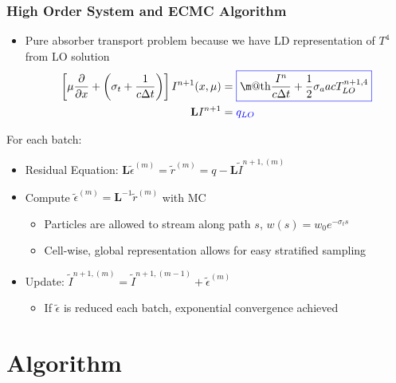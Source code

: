 \documentclass[xcolor=dvipsnames,hyperref={pdfpagelabels=false},unknownkeysallowed]{beamer}
\makeatletter
\newcommand*{\boxedcolor}{blue}
\renewcommand{\boxed}[1]{\textcolor{\boxedcolor}{%
  \fbox{\normalcolor\m@th$\displaystyle#1$}}}
\newcommand{\colb}[1]{{\color{blue} #1}}
\newlength{\wideitemsep}
\let\olditem\item
\renewcommand{\item}{\setlength{\itemsep}{\wideitemsep}\olditem}
\newcommand{\pderiv}[2]{\frac{\partial #1}{\partial #2}}
\newcommand{\B}[1]{\ensuremath{\mathbf{#1}}}
\makeatother
\begin{document}
\begin{frame}
    \frametitle{High Order System and ECMC Algorithm}
    \begin{itemize}
        \item \colb{Pure absorber} transport problem because we have LD
            representation of $T^4$ from LO solution
        \begin{align*}
            \left[\mu \pderiv{}{x} + \left(\sigma_t+\frac{1}{c\Delta t}\right)\right]I^{n+1}(x,\mu)
            &= \boxed{\frac{I^{n}}{c\Delta t} + \frac{1}{2}\sigma_a a c T_{LO}^{n+1,4}} \\
            \B L I^{n+1} &= \colb{q_{LO}}
     \end{align*}
        \vspace{-0.3in}
        \end{itemize}
        \begin{block}{For each batch:}
         \begin{itemize}
        \item Residual Equation: $\displaystyle \B L \tilde 
            \epsilon^{(m)} =
            \tilde r^{(m)} = q - \B L \tilde I^{n+1,(m)}$
        \item Compute $\tilde{\epsilon}^{(m)} = \B L^{-1} \tilde{r}^{(m)}$ with MC 
            \begin{itemize}
                \item Particles are allowed to stream along path $s$, $w(s)=w_0 e^{-\sigma_t s}$
                \item Cell-wise, global representation allows for easy \colb{stratified} sampling
            \end{itemize}
        \item Update: $\tilde I^{n+1,(m)} = \tilde I^{n+1,(m-1)} + \tilde \epsilon^{(m)}$
        \begin{itemize}
            \item If $\tilde{\epsilon}$ is reduced each batch, \colb{exponential convergence
                achieved}
        \end{itemize}
    \end{itemize}
\end{block}
\end{frame}

\section{Algorithm}
\end{document}
